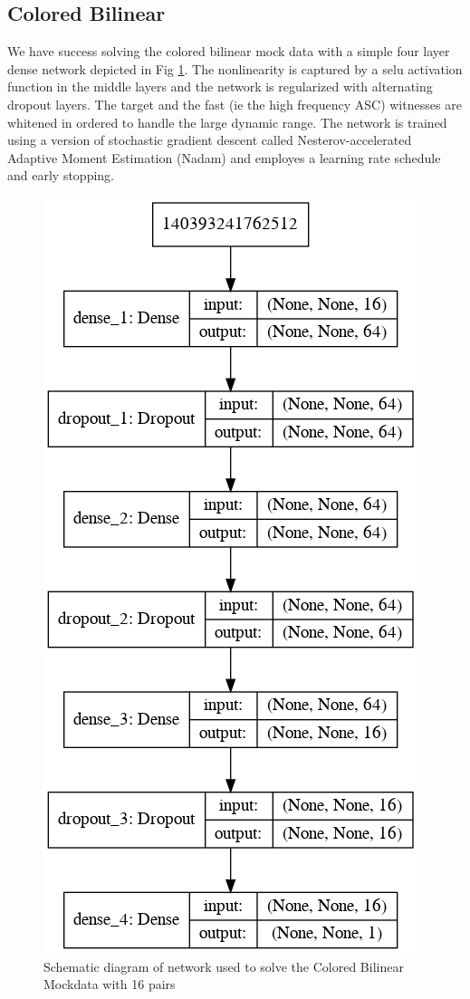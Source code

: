 \begin{refsection}
\subsection{Colored Bilinear}
We have success solving the colored bilinear mock data with a simple four layer dense network depicted in Fig \ref{fig:net}.
The nonlinearity is captured by a selu activation function in the middle layers and the network is regularized with alternating dropout layers. 
The target and the  fast (ie the high frequency ASC) witnesses are whitened in ordered to handle the large dynamic range.
The network is trained using a version of stochastic gradient descent called Nesterov-accelerated Adaptive Moment Estimation (Nadam) and employes a learning rate schedule and early stopping.


\begin{figure}[htbp]
   \centering
   \includegraphics[width=.7\columnwidth]{chapter_noise_sub/etc/net_diag}
   \caption{Schematic diagram of network used to solve the Colored Bilinear Mockdata with 16 pairs}
   \label{fig:net}
\end{figure}


\end{refsection}
